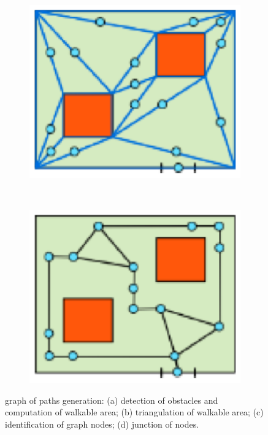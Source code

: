 \begin{figure}[!htbp]
 ~
 \begin{subfigure}[b]{0.235\textwidth}
 \includegraphics[width=\textwidth]{images/graph-generation/single/graph-generation-3}
 \caption{}
 \label{fig:graph-generation-c}
 \end{subfigure}
 ~
 \begin{subfigure}[b]{0.235\textwidth}
 \includegraphics[width=\textwidth]{images/graph-generation/single/graph-generation-4}
 \caption{}
 \label{fig:graph-generation-d}
 \end{subfigure}
 
 \caption{graph of paths generation: 
 (a) detection of obstacles and computation of walkable area; 
 (b) triangulation of walkable area; 
 (c) identification of graph nodes; 
 (d) junction of nodes.
 }
 \label{fig:graph-generation}
\end{figure}


